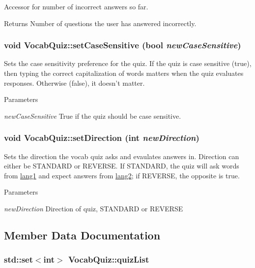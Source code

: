 \label{classVocabQuiz_a53b2eecb43a9ae1bc9d975a5e91d8ad6}
Accessor for number of incorrect answers so far. \begin{DoxyReturn}{Returns}
Number of questions the user has answered incorrectly. 
\end{DoxyReturn}
\hypertarget{classVocabQuiz_ac858d591b947ad29f464280c995e1d08}{
\subsubsection[{setCaseSensitive}]{\setlength{\rightskip}{0pt plus 5cm}void VocabQuiz::setCaseSensitive (bool {\em newCaseSensitive})}}
\label{classVocabQuiz_ac858d591b947ad29f464280c995e1d08}
Sets the case sensitivity preference for the quiz. If the quiz is case sensitive (true), then typing the correct capitalization of words matters when the quiz evaluates responses. Otherwise (false), it doesn't matter. 
\begin{DoxyParams}{Parameters}
\item[{\em newCaseSensitive}]True if the quiz should be case sensitive. \end{DoxyParams}
\hypertarget{classVocabQuiz_ac9714af01fec150cdbb9d01ab305ff61}{
\subsubsection[{setDirection}]{\setlength{\rightskip}{0pt plus 5cm}void VocabQuiz::setDirection (int {\em newDirection})}}
\label{classVocabQuiz_ac9714af01fec150cdbb9d01ab305ff61}
Sets the direction the vocab quiz asks and evaulates answers in. Direction can either be STANDARD or REVERSE. If STANDARD, the quiz will ask words from \hyperlink{structlang1}{lang1} and expect answers from \hyperlink{structlang2}{lang2}; if REVERSE, the opposite is true. 
\begin{DoxyParams}{Parameters}
\item[{\em newDirection}]Direction of quiz, STANDARD or REVERSE \end{DoxyParams}


\subsection{Member Data Documentation}
\hypertarget{classVocabQuiz_a294e44914f7766a1cdfff9ae87c722ff}{
\subsubsection[{quizList}]{\setlength{\rightskip}{0pt plus 5cm}std::set$<$int$>$ {\bf VocabQuiz::quizList}}}
\label{classVocabQuiz_a294e44914f7766a1cdfff9ae87c722ff}


